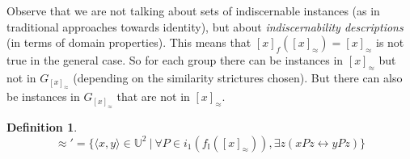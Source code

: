 \documentclass[11pt,a4paper,notitlepage,onecolumn,twoside]{article}
\newtheorem{definition}{Definition}
\begin{document}
Observe that we are not talking about sets of indiscernable instances
(as in traditional approaches towards identity),
but about \emph{indiscernability descriptions}
(in terms of domain properties).
This means that $[x]_f([x]_{\approx}) = [x]_{\approx}$ is not true in the
general case. So for each group there can be instances in $[x]_{\approx}$
but not in $G_{[x]_{\approx}}$
(depending on the similarity strictures chosen).
But there can also be instances in $G_{[x]_{\approx}}$ that are not in
$[x]_{\approx}$.

\begin{definition}
\begin{equation}
\approx' = \{ \langle x, y \rangle \in \mathbb{U}^2 \  \vert \ 
    \forall P \in i_1(f_{\mathbb{I}}([x]_{\approx})), \exists z (xPz \leftrightarrow yPz) \}
\end{equation}
\end{definition}
\end{document}

